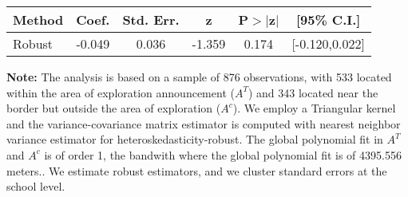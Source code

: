 \begin{table}[htbp]\centering
 \footnotesize 
\begin{tabular}{lccccc}
\hline\hline
Method & Coef. & Std. Err. & z & P$>|$z$|$ & [95\% C.I.] \\ 
\hline \hline  
Robust & -0.049 & 0.036 & -1.359 & 0.174 & [-0.120,0.022] \\ 
  \hline\hline
\end{tabular}
\label{table:rd}
\begin{tablenotes} 
  \justifying \tiny \textbf{Note: }    
   The analysis is based on a sample of 876 observations, with 533 located within the area of exploration announcement ($A^{T}$) and 343 located near the border but outside the area of exploration  ($A^{c}$). 
           We employ a Triangular kernel and the variance-covariance matrix estimator is computed with nearest neighbor variance estimator for heteroskedasticity-robust. The global polynomial fit in  $A^{T}$ and $A^{c}$ is of order 1, the bandwith where the global polynomial fit is of 4395.556 meters.. We estimate robust estimators, and we cluster standard errors at the school level. \end{tablenotes} 
 \end{table} 
